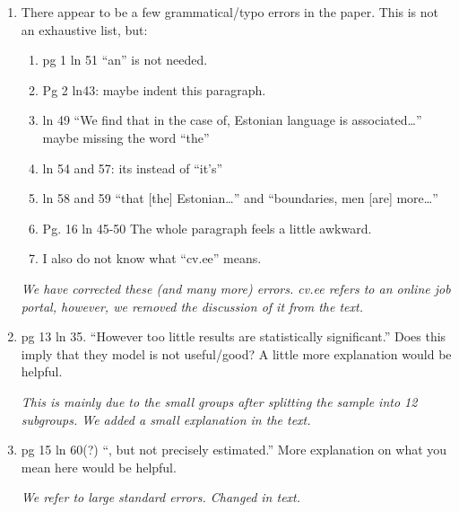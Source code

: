 \documentclass{article}
\newenvironment{response}
{\slshape}{}
\begin{document}
\begin{enumerate}
\item There appear to be a few grammatical/typo errors in
  the paper. This is not an exhaustive list, but: 
  \begin{enumerate}
  \item pg 1 ln 51 “an” is
    not needed. 
  \item Pg 2 ln43: maybe indent this paragraph. 
  \item ln 49 “We find
    that in the case of, Estonian language is associated…” maybe missing
    the word “the”  
  \item ln 54 and 57: its instead of “it’s” 
  \item ln 58 and 59
    “that [the] Estonian…” and “boundaries, men [are] more…” 
  \item Pg. 16 ln
    45-50 The whole paragraph feels a little awkward. 
  \item I also do not know
    what “cv.ee” means.
  \end{enumerate}

  \begin{response}
    We have corrected these (and many more) errors.  cv.ee refers to
    an online job portal, however, we removed the discussion of
    it from the text.
  \end{response}

\item pg 13 ln 35. “However too little results are
  statistically significant.” Does this imply that they model is not
  useful/good? A little more explanation would be helpful.

  \begin{response}
    This is mainly due to the small groups after splitting the sample
    into 12 subgroups.  We added a small explanation in the text.
  \end{response}

\item pg 15 ln 60(?) “, but not precisely estimated.” More explanation
  on what you mean here would be helpful.

  \begin{response}
    We refer to large standard errors.  Changed in text.
  \end{response}
\end{enumerate}
\end{document}
